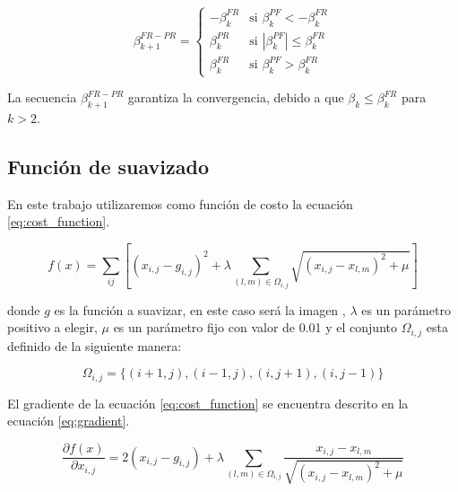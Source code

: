 \begin{equation}
    \beta_{k+1}^{FR-PR} = \begin{cases}
        -\beta_k^{FR} & \text{si } \beta_k^{PF} < -\beta_k^{FR}     \\
        \beta_k^{PR}  & \text{si } |\beta_k^{PF}| \leq \beta_k^{FR} \\
        \beta_k^{FR}  & \text{si } \beta_k^{PF} >\beta_k^{FR}
    \end{cases} \label{eq:FR_PR_beta}
\end{equation}

La secuencia $\beta_{k+1}^{FR-PR}$ garantiza la convergencia, debido a que $\beta_k \leq \beta_k^{FR}$ para $k>2$.

\subsection{Función de suavizado}

En este trabajo utilizaremos como función de costo la ecuación \ref{eq:cost_function}.

\begin{equation}
    f(x) =\sum_{ij} \left[(x_{i,j}-g_{i,j})^2 + \lambda \sum_{(l,m)\in \Omega_{i,j}}\sqrt{(x_{i,j}-x_{l,m})^2+\mu} \right] \label{eq:cost_function}
\end{equation}

donde $g$ es la función a suavizar, en este caso será la imagen , $\lambda$ es un parámetro positivo a elegir, $\mu$ es un parámetro fijo con valor de 0.01 y el conjunto $\Omega_{i,j}$ esta definido de la siguiente manera:

\begin{equation*}
    \Omega_{i,j} = \{ (i+1,j), (i-1,j), (i,j+1), (i,j-1)\}
\end{equation*}

El gradiente de la ecuación \ref{eq:cost_function} se encuentra descrito en la ecuación \ref{eq:gradient}.

\begin{equation}
    \frac{\partial f(x)}{\partial x_{i,j}} = 2(x_{i,j} -g_{i,j}) + \lambda \sum_{(l,m) \in \Omega_{i,j}} \frac{x_{i,j}-x_{l,m}}{\sqrt{(x_{i,j}-x_{l,m})^2+\mu}} \label{eq:gradient}
\end{equation}

